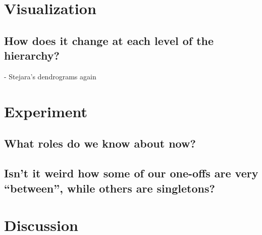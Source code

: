 \section{Visualization}

\subsection{How does it change at each level of the hierarchy?}

- Stejara's dendrograms again

\section{Experiment}

\subsection{What roles do we know about now?}

\subsection{Isn't it weird how some of our one-offs are very ``between'', while others are singletons?}

\section{Discussion}


%
%
%
%

